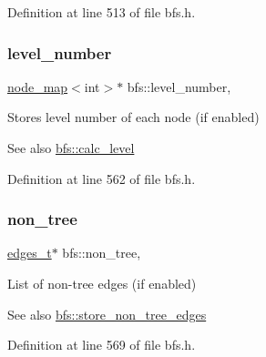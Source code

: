 Definition at line 513 of file bfs.\+h.

\mbox{\label{classbfs_aab92e9d128612c28324aafe4750dbc84}} 
\subsubsection{\texorpdfstring{level\+\_\+number}{level\_number}}
{\footnotesize\ttfamily \mbox{\hyperlink{classnode__map}{node\+\_\+map}}$<$int$>$$\ast$ bfs\+::level\+\_\+number\hspace{0.3cm}{\ttfamily [protected]}, {\ttfamily [inherited]}}



Stores level number of each node (if enabled) 

\begin{DoxySeeAlso}{See also}
\mbox{\hyperlink{classbfs_a491515da4eb8efca0be4fef0df350a8e}{bfs\+::calc\+\_\+level}} 
\end{DoxySeeAlso}


Definition at line 562 of file bfs.\+h.

\mbox{\label{classbfs_a056b2131db11e62eb8f41c8dcc117d2e}} 
\subsubsection{\texorpdfstring{non\+\_\+tree}{non\_tree}}
{\footnotesize\ttfamily \mbox{\hyperlink{edge_8h_a8f9587479bda6cf612c103494b3858e3}{edges\+\_\+t}}$\ast$ bfs\+::non\+\_\+tree\hspace{0.3cm}{\ttfamily [protected]}, {\ttfamily [inherited]}}



List of non-\/tree edges (if enabled) 

\begin{DoxySeeAlso}{See also}
\mbox{\hyperlink{classbfs_a7de47b820fb9532f497660f767c9457f}{bfs\+::store\+\_\+non\+\_\+tree\+\_\+edges}} 
\end{DoxySeeAlso}


Definition at line 569 of file bfs.\+h.

\mbox{\label{classbfs_a3bac5ed333bb78a30a67099c3b94aa0c}} 
